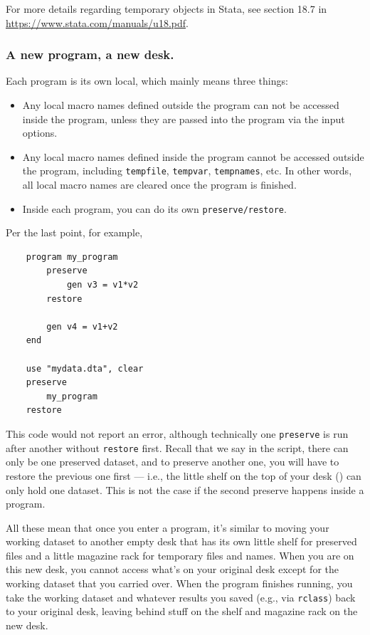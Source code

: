 For more details regarding temporary objects in Stata, see section 18.7 in \url{https://www.stata.com/manuals/u18.pdf}.

\subsubsection{A new program, a new desk.}
Each program is its own local, which mainly means three things:
\begin{itemize}
    \item Any local macro names defined outside the program can not be accessed inside the program, unless they are passed into the program via the input options.
    \item Any local macro names defined inside the program cannot be accessed outside the program, including \verb|tempfile|, \verb|tempvar|, \verb|tempnames|, etc. In other words, all local macro names are cleared once the program is finished.
    \item Inside each program, you can do its own \verb|preserve/restore|.
\end{itemize}
Per the last point, for example,
\begin{verbatim}
    program my_program
        preserve 
            gen v3 = v1*v2
        restore

        gen v4 = v1+v2
    end

    use "mydata.dta", clear 
    preserve
        my_program
    restore
\end{verbatim}
This code would not report an error, although technically one \verb|preserve| is run after another without \verb|restore| first. Recall that we say in the script, there can only be one preserved dataset, and to preserve another one, you will have to restore the previous one first --- i.e., the little shelf on the top of your desk () can only hold one dataset. This is not the case if the second preserve happens inside a program. 

All these mean that once you enter a program, it's similar to moving your working dataset to another empty desk that has its own little shelf for preserved files and a little magazine rack for temporary files and names. When you are on this new desk, you cannot access what's on your original desk except for the working dataset that you carried over. When the program finishes running, you take the working dataset and whatever results you saved (e.g., via \verb|rclass|) back to your original desk, leaving behind stuff on the shelf and magazine rack on the new desk. 

